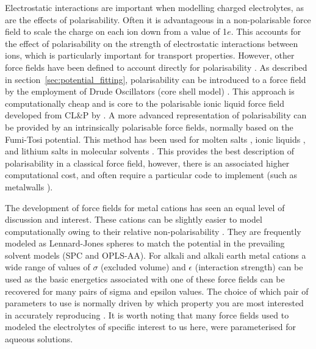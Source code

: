 \documentclass[../main.tex]{subfiles}
\begin{document}
Electrostatic interactions are important when modelling charged electrolytes, as are the effects of polarisability. Often it is advantageous in a non-polarisable force field to scale the charge on each ion down from a value of 1$e$\cite{schroder_comparing_2012, schroder_polarizable_2020, shimizu_structural_2015}. This accounts for the effect of polarisability on the strength of electrostatic interactions between ions, which is particularly important for transport properties. However, other force fields have been defined to account directly for polarisability \cite{schroder_polarizable_2020}. As described in section~\ref{sec:potential_fitting}, polarisability can be introduced to a force field by the employment of Drude Oscillators (core shell model) \cite{schroder_polarizable_2020, schroder_comparing_2012, lindahl_gromacs_2021}. This approach is computationally cheap and is core to the polarisable ionic liquid force field developed from CL\&P by \citeauthor{schroder_comparing_2012} \cite{schroder_comparing_2012}. A more advanced representation of polarisability can be provided by an intrinsically polarisable force fields, normally based on the Fumi-Tosi potential. \cite{sangster1976interionic} This method has been used for molten salts \cite{madden_covalent_1996}, ionic liquids \cite{borodin_polarizable_2009, schroder_polarizable_2020}, and lithium salts in molecular solvents \cite{borodin_litfsi_2006,bedrov_molecular_2019,bedrov_influence_2010}. This provides the best description of polarisability in a classical force field, however, there is an associated higher computational cost, and often require a particular code to implement (such as metalwalls \cite{marin-lafleche_metalwalls_2020}).

The development of force fields for metal cations has seen an equal level of discussion and interest. These cations can be slightly easier to model computationally owing to their relative non-polarisability \cite{mamatkulov_force_2013,mamatkulov_force_2018,schroder_polarizable_2020}. They are frequently modeled as Lennard-Jones spheres to match the potential in the prevailing solvent models (SPC and OPLS-AA). For alkali and alkali earth metal cations a wide range of values of $\sigma$ (excluded volume) and $\epsilon$ (interaction strength) can be used as the basic energetics associated with one of these force fields can be recovered for many pairs of sigma and epsilon values. The choice of which pair of parameters to use is normally driven by which property you are most interested in accurately reproducing \cite{mamatkulov_force_2013}. It is worth noting that many force fields used to modeled the electrolytes of specific interest to us here, were parameterised for aqueous solutions\cite{mamatkulov_force_2013}.
\end{document}
